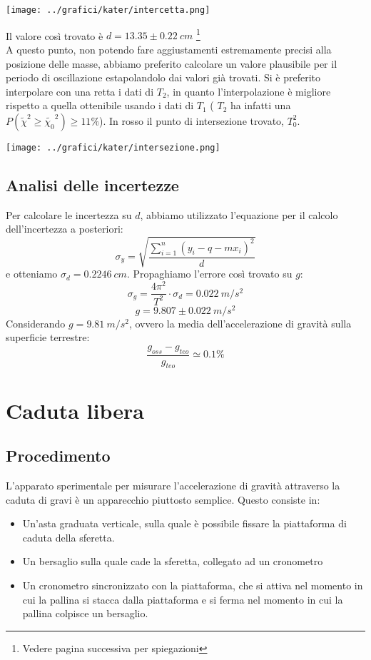 \begin{center}
\texttt{[image: ../grafici/kater/intercetta.png]}
\end{center}
Il valore così trovato è $d = 13.35 \pm 0.22\ cm$ \footnote{Vedere pagina successiva per spiegazioni}
\\
A questo punto, non potendo fare aggiustamenti estremamente precisi alla posizione delle masse, abbiamo preferito calcolare un valore plausibile per il periodo di oscillazione estapolandolo dai valori già trovati. Si è preferito interpolare con una retta i dati di  $T_2$, in quanto l'interpolazione è migliore rispetto a quella ottenibile usando i dati di $T_1$ ( $T_2$ ha infatti una $P(\tilde{\chi}^2 \geq \tilde{\chi_0}^2) \geq 11\%$).
In rosso il punto di intersezione trovato, $T^2_0$.

\begin{center}
\texttt{[image: ../grafici/kater/intersezione.png]}
\end{center}

\subsection{Analisi delle incertezze}

Per calcolare le incertezza su $d$, abbiamo utilizzato l'equazione per il calcolo dell'incertezza a posteriori:
\begin{equation}
\sigma_y = \displaystyle\sqrt{\frac{\displaystyle\sum^n_{i=1}\left(y_i-q-mx_i \right)^2}{d}}
\end{equation}
e otteniamo $\sigma_d = 0.2246\ cm$. 
Propaghiamo l'errore così trovato su $g$:
$$\sigma_g = \frac{4 \pi^2}{T^2} \cdot \sigma_d = 0.022 \ m/s^2$$
$$ g = 9.807 \pm 0.022 \ m/s^2 $$
Considerando $g=9.81\ m/s^2$, ovvero la media dell'accelerazione di gravità sulla superficie terrestre:
$$\frac{g_{oss} - g_{teo}}{g_{teo}} \simeq 0.1\% $$



\section{Caduta libera}
\subsection{Procedimento}
L'apparato sperimentale per misurare l'accelerazione di gravità attraverso la caduta di gravi è un apparecchio piuttosto semplice. Questo consiste in:
\begin{itemize}
 \item Un'asta graduata verticale, sulla quale è possibile fissare la piattaforma di caduta della sferetta.
 \item Un bersaglio sulla quale cade la sferetta, collegato ad un cronometro
 \item Un cronometro sincronizzato con la piattaforma, che si attiva nel momento in cui la pallina si stacca dalla piattaforma e si ferma nel momento in cui la pallina colpisce un bersaglio.
\end{itemize}

